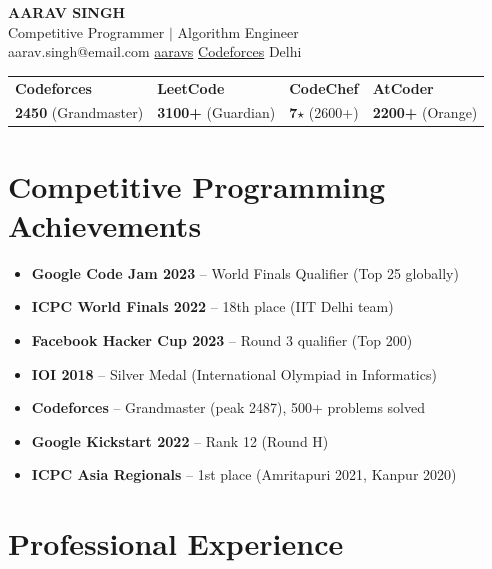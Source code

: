 \documentclass[10pt,letterpaper]{article}
\begin{document}
\begin{center}
{\LARGE\bfseries\color{cpred} AARAV SINGH}\\[3pt]
{\normalsize Competitive Programmer $\vert$ Algorithm Engineer}\\[4pt]
{\small {} aarav.singh@email.com \quad {} \href{https://github.com/aaravs}{aaravs} \quad {} \href{https://codeforces.com/profile/aarav\_s}{Codeforces} \quad {} Delhi}
\end{center}

\vspace{4pt}
\begin{tcolorbox}
\begin{tabularx}{\linewidth}{@{}XXXX@{}}
\textbf{\color{cpred}Codeforces} & \textbf{LeetCode} & \textbf{CodeChef} & \textbf{AtCoder}\\
\textbf{2450} (Grandmaster) & \textbf{3100+} (Guardian) & \textbf{7$\star$} (2600+) & \textbf{2200+} (Orange)\\
\end{tabularx}
\end{tcolorbox}

\section{Competitive Programming Achievements}
\begin{itemize}
\item \textbf{Google Code Jam 2023} -- World Finals Qualifier (Top 25 globally)
\item \textbf{ICPC World Finals 2022} -- 18th place (IIT Delhi team)
\item \textbf{Facebook Hacker Cup 2023} -- Round 3 qualifier (Top 200)
\item \textbf{IOI 2018} -- Silver Medal (International Olympiad in Informatics)
\item \textbf{Codeforces} -- Grandmaster (peak 2487), 500+ problems solved
\item \textbf{Google Kickstart 2022} -- Rank 12 (Round H)
\item \textbf{ICPC Asia Regionals} -- 1st place (Amritapuri 2021, Kanpur 2020)
\end{itemize}

\section{Professional Experience}
\end{document}
